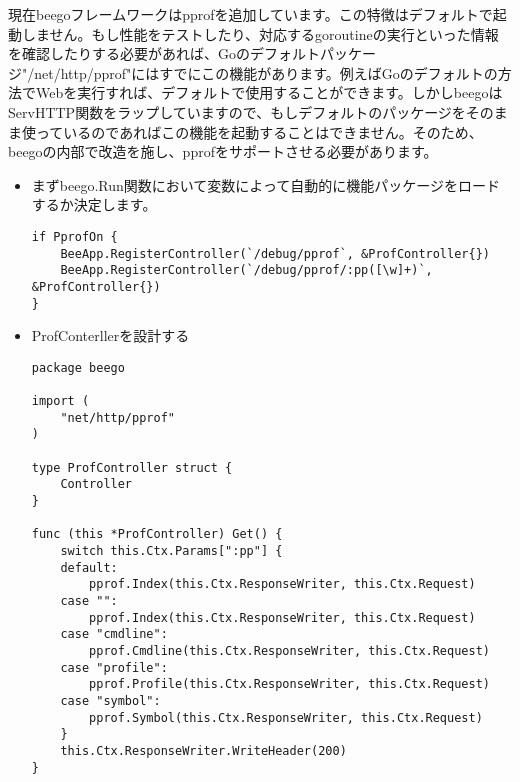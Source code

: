 現在beegoフレームワークはpprofを追加しています。この特徴はデフォルトで起動しません。もし性能をテストしたり、対応するgoroutineの実行といった情報を確認したりする必要があれば、Goのデフォルトパッケージ"/net/http/pprof"にはすでにこの機能があります。例えばGoのデフォルトの方法でWebを実行すれば、デフォルトで使用することができます。しかしbeegoはServHTTP関数をラップしていますので、もしデフォルトのパッケージをそのまま使っているのであればこの機能を起動することはできません。そのため、beegoの内部で改造を施し、pprofをサポートさせる必要があります。

\begin{itemize}
  \item まずbeego.Run関数において変数によって自動的に機能パッケージをロードするか決定します。
\begin{lstlisting}[numbers=none]
if PprofOn {
    BeeApp.RegisterController(`/debug/pprof`, &ProfController{})
    BeeApp.RegisterController(`/debug/pprof/:pp([\w]+)`, &ProfController{})
}
\end{lstlisting}
  \item ProfConterllerを設計する
\begin{lstlisting}[numbers=none]
package beego

import (
    "net/http/pprof"
)

type ProfController struct {
    Controller
}

func (this *ProfController) Get() {
    switch this.Ctx.Params[":pp"] {
    default:
        pprof.Index(this.Ctx.ResponseWriter, this.Ctx.Request)
    case "":
        pprof.Index(this.Ctx.ResponseWriter, this.Ctx.Request)
    case "cmdline":
        pprof.Cmdline(this.Ctx.ResponseWriter, this.Ctx.Request)
    case "profile":
        pprof.Profile(this.Ctx.ResponseWriter, this.Ctx.Request)
    case "symbol":
        pprof.Symbol(this.Ctx.ResponseWriter, this.Ctx.Request)
    }
    this.Ctx.ResponseWriter.WriteHeader(200)
}
\end{lstlisting}
\end{itemize}

